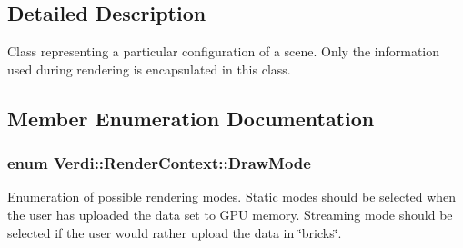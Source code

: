 \subsection{\-Detailed \-Description}
\-Class representing a particular configuration of a scene. \-Only the information used during rendering is encapsulated in this class. 

\subsection{\-Member \-Enumeration \-Documentation}
\hypertarget{class_verdi_1_1_render_context_a57f01ede0284c624c24fc1660075fecc}{
\subsubsection[{\-Draw\-Mode}]{\setlength{\rightskip}{0pt plus 5cm}enum {\bf \-Verdi\-::\-Render\-Context\-::\-Draw\-Mode}}}\label{class_verdi_1_1_render_context_a57f01ede0284c624c24fc1660075fecc}
\-Enumeration of possible rendering modes. \-Static modes should be selected when the user has uploaded the data set to \-G\-P\-U memory. \-Streaming mode should be selected if the user would rather upload the data in \char`\"{}bricks\char`\"{}. 

